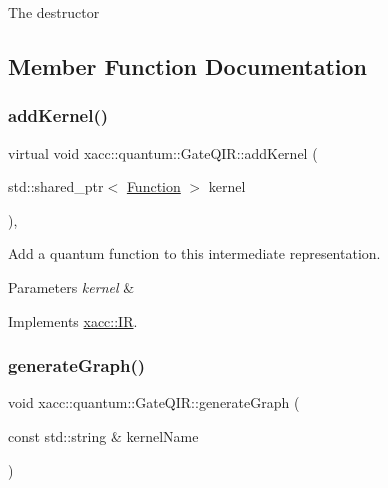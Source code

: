 The destructor 

\subsection{Member Function Documentation}
\mbox{\label{a01296_aa6ed2cf2cbcfec8105c327a4fa95346f}} 
\subsubsection{\texorpdfstring{add\+Kernel()}{addKernel()}}
{\footnotesize\ttfamily virtual void xacc\+::quantum\+::\+Gate\+Q\+I\+R\+::add\+Kernel (\begin{DoxyParamCaption}\item[{std\+::shared\+\_\+ptr$<$ \hyperlink{a02456}{Function} $>$}]{kernel }\end{DoxyParamCaption})\hspace{0.3cm}{\ttfamily [inline]}, {\ttfamily [virtual]}}

Add a quantum function to this intermediate representation. 
\begin{DoxyParams}{Parameters}
{\em kernel} & \\
\hline
\end{DoxyParams}


Implements \hyperlink{a02480_abbbf8e6993c518597de32cd05d49d737}{xacc\+::\+IR}.

\mbox{\label{a01296_ad1ddd6105346dd9fc78648fd812285ed}} 
\subsubsection{\texorpdfstring{generate\+Graph()}{generateGraph()}}
{\footnotesize\ttfamily void xacc\+::quantum\+::\+Gate\+Q\+I\+R\+::generate\+Graph (\begin{DoxyParamCaption}\item[{const std\+::string \&}]{kernel\+Name }\end{DoxyParamCaption})\hspace{0.3cm}{\ttfamily [virtual]}}

